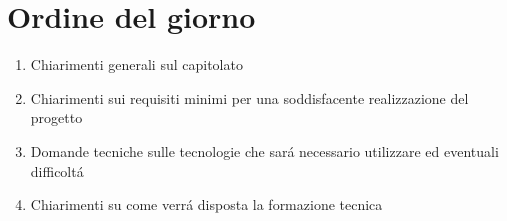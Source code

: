 \documentclass[a4paper,12pt]{article}
\begin{document}
\section{Ordine del giorno}

\begin{enumerate}
    \item Chiarimenti generali sul capitolato
    \item Chiarimenti sui requisiti minimi per una soddisfacente realizzazione del progetto
    \item Domande tecniche sulle tecnologie che sará necessario utilizzare ed eventuali difficoltá
    \item Chiarimenti su come verrá disposta la formazione tecnica

\end{enumerate}
\end{document}

